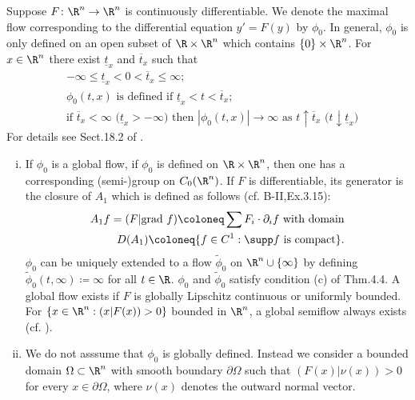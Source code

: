 \begin{example}\label{ex:b3-4.6}
	Suppose $F \colon \R^n \to \R^n$ is continuously differentiable.
	We denote the maximal flow corresponding to the differential equation $y' = F(y)$ by $\phi_{0}$.
	In general, $\phi_{0}$ is only defined on an open subset of $\R \times \R^n$ which contains $\{0\} \times \R^n$.
	For $x \in \R^n$ there exist $\underline{t}_{x}$ and $\overline{t}_{x}$ such that
	\begin{equation}\label{eq:b3-4.11}
		\begin{aligned}
			&-\infty \leq \underline{t}_{x} < 0 < \overline{t}_{x} \leq \infty; \\
			&\phi_{0}(t,x) \text{ is defined if } \underline{t}_{x} < t < \overline{t}_{x}; \\
			&\text{if } \overline{t}_{x} < \infty \text{ (}\underline{t}_{x} > -\infty\text{)} \text{ then } |\phi_{0}(t,x)| \to \infty \text{ as } t\uparrow\overline{t}_{x} \text{ (}t\downarrow\underline{t}_{x}\text{)}
		\end{aligned}
	\end{equation}
	For details see Sect.18.2 of \citet{dieudonne:1971}.
	\begin{enumerate}[(i), wide]
	\item
	If $\phi_{0}$ is a global flow, \ie if $\phi_{0}$ is defined on $\R \times \R^n$, then one has a corresponding (semi-)group on $C_{0}(\R^n)$.
	If $F$ is differentiable, its generator is the closure of $A_{1}$ which is defined as follows (cf. B-II,Ex.3.15):
	\begin{equation}\label{eq:b3-4.12}
		\begin{aligned}
			A_{1}f = (F|\text{grad }f) \coloneq \sum F_{i} \cdot \partial_{i}f \text{ with domain} \\
			D(A_{1}) \coloneq \{f \in C^1 : \supp f \text{ is compact}\}.
		\end{aligned}
	\end{equation}
	$\phi_{0}$ can be uniquely extended to a flow $\tilde{\phi}_{0}$ on $\R^n\cup\{\infty\}$ by defining $\tilde{\phi}_{0}(t,\infty) \coloneq \infty$ for all $t \in \R$.
	$\phi_{0}$ and $\tilde{\phi}_{0}$ satisfy condition (c) of Thm.4.4.
%
A global flow exists if $F$ is globally Lipschitz continuous or uniformly bounded. For $\{x \in \R^n : (x|F(x)) > 0\}$ bounded in $\R^n$, a global semiflow always exists (cf. \citet[Sec.5.2]{deimling:1977}).
	\item 
	We do not asssume that  $\phi_0$ is globally defined.
	Instead we consider a bounded domain $\Omega \subset \R^n$ with smooth boundary $\partial\Omega$ such that $(F(x)|\nu(x)) > 0$ for every $x \in \partial\Omega$, where $\nu(x)$ denotes the outward normal vector.
	

\end{enumerate}
\end{example}
